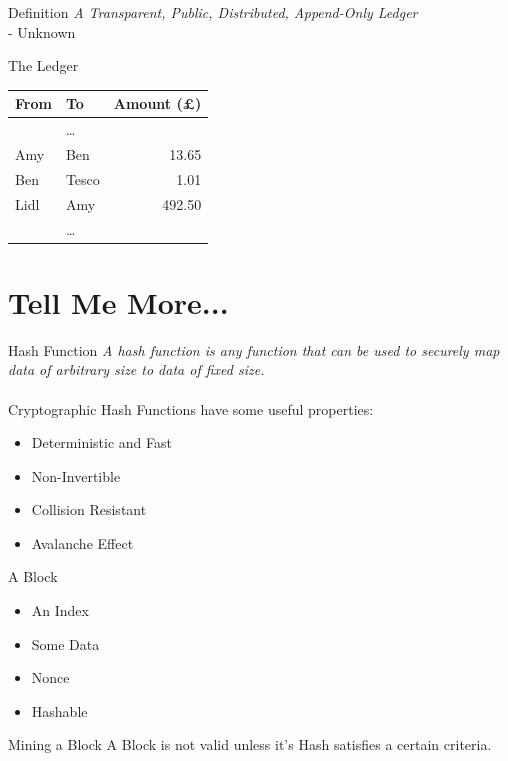 \documentclass{beamer}
\begin{document}
\begin{frame}{Definition}
\emph{A Transparent, Public, Distributed, Append-Only Ledger}\\ - Unknown
\end{frame}


\begin{frame}{The Ledger}
\begin{center}
  \begin{tabular}{llr} \toprule
    From & To & Amount (£)\\
    \midrule
    & \dots & \\
    Amy & Ben & 13.65 \\
    Ben & Tesco & 1.01 \\
    Lidl & Amy & 492.50 \\
    & \dots & \\
  \end{tabular}
\end{center}
\end{frame}


\section{Tell Me More...}


\begin{frame}{Hash Function}
\emph{A hash function is any function that can be used to \alert{securely} map data of arbitrary size to data of fixed size.}\\
\\
Cryptographic Hash Functions have some useful properties:
\begin{itemize}
  \item Deterministic and Fast
  \item Non-Invertible
  \item Collision Resistant
  \item Avalanche Effect
\end{itemize}
\end{frame}


\begin{frame}{A Block}
\begin{itemize}
  \item An Index
  \item Some Data
  \item Nonce
  \item Hashable
\end{itemize}
\end{frame}


\begin{frame}{Mining a Block}
A Block is not \alert{valid} unless it's Hash satisfies a certain criteria.
\end{frame}
\end{document}

